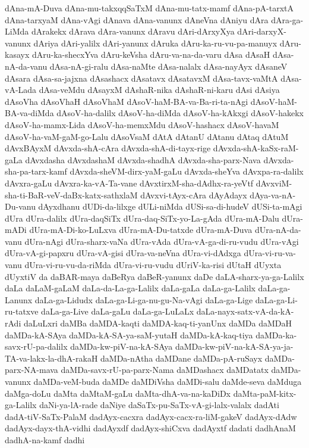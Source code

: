 {dAna-mA-Duva
dAna-mu-takxqqSaTxM
dAna-mu-tatx-mamf
dAna-pA-tarxtA
dAna-tarxyaM
dAna-vAgi
dAnava
dAna-vanunx
dAneVna
dAniyu
dAra
dAra-ga-LiMda
dArakekx
dArava
dAra-vanunx
dAravu
dAri-dArxyXya
dAri-darxyX-vanunx
dAriya
dAri-yalilx
dAri-yanunx
dAruka
dAru-ka-ru-vu-pa-manuyx
dAru-kasayx
dAru-ka-shecxYva
dAru-keVsha
dAru-va-na-da-varu
dAsa
dAsaH
dAsa-nA-da-vanu
dAsa-nA-gi-ralu
dAsa-naMte
dAsa-nalalx
dAsa-nayAyx
dAsaneV
dAsara
dAsa-sa-jajxna
dAsashacx
dAsatavx
dAsatavxM
dAsa-tavx-vaMtA
dAsa-vA-Lada
dAsa-veMdu
dAsayxM
dAshaR-nika
dAshaR-ni-karu
dAsi
dAsiya
dAsoVha
dAsoVhaH
dAsoVhaM
dAsoV-haM-BA-va-Ba-ri-ta-nAgi
dAsoV-haM-BA-va-diMda
dAsoV-ha-dalilx
dAsoV-ha-diMda
dAsoV-ha-kAkxgi
dAsoV-hakekx
dAsoV-ha-mamx-Lida
dAsoV-ha-memxMdu
dAsoV-hashacx
dAsoV-havaM
dAsoV-ha-vaM-gaM-go-Lalu
dAsoVsaM
dAtA
dAtanU
dAtanu
dAtaq
dAtuM
dAvxBAyxM
dAvxda-shA-cAra
dAvxda-shA-di-tayx-rige
dAvxda-shA-kaSx-raM-gaLa
dAvxdasha
dAvxdashaM
dAvxda-shadhA
dAvxda-sha-parx-Nava
dAvxda-sha-pa-tarx-kamf
dAvxda-sheVM-dirx-yaM-gaLu
dAvxda-sheYva
dAvxpa-ra-dalilx
dAvxra-gaLu
dAvxra-ka-vA-Ta-vane
dAvxtirxM-sha-dAdhx-ra-yeVtf
dAvxviM-sha-ti-BaR-veV-daBx-katx-sathxlaM
dAvxvi-tAyx-cAra
dAyAdayx
dAya-va-nA-Du-vanu
dAyxdhanu
dUDi-da-lilxge
dULi-niMda
dUSi-sa-di-hudeV
dUSi-ta-mAgi
dUra
dUra-dalilx
dUra-daqSiTx
dUra-daq-SiTx-yo-La-gAda
dUra-mA-Dalu
dUra-mADi
dUra-mA-Di-ko-LuLxva
dUra-mA-Du-tatxde
dUra-mA-Duva
dUra-nA-da-vanu
dUra-nAgi
dUra-sharx-vaNa
dUra-vAda
dUra-vA-ga-di-ru-vudu
dUra-vAgi
dUra-vA-gi-papxru
dUra-vA-gisi
dUra-va-neVna
dUra-vi-dAdxga
dUra-vi-ru-va-vanu
dUra-vi-ru-vu-da-riMda
dUra-vi-ru-vudu
dUriV-ka-risi
dUtaH
dUyxta
dUyxtiV
da
daBAR-maya
daBeRya
daBeR-yanunx
daDe
daLA-sharx-ya-ga-Lalilx
daLa
daLaM-gaLaM
daLa-da-La-ga-Lalilx
daLa-gaLa
daLa-ga-Lalilx
daLa-ga-Lanunx
daLa-ga-Lidudx
daLa-ga-Li-ga-nu-gu-Na-vAgi
daLa-ga-Lige
daLa-ga-Li-ru-tatxve
daLa-ga-Live
daLa-gaLu
daLa-ga-LuLaLx
daLa-nayx-satx-vA-da-kA-rAdi
daLuLxri
daMBa
daMDA-kaqti
daMDA-kaq-ti-yanUnx
daMDa
daMDaH
daMDa-kA-SAya
daMDa-kA-SA-ya-saM-yutaH
daMDa-kA-kaq-tiya
daMDa-ka-savx-rU-pa-dalilx
daMDa-kw-piV-na-kA-SAya
daMDa-kw-piV-na-kA-SA-ya-ja-TA-va-lakx-la-dhA-rakaH
daMDa-nAtha
daMDane
daMDa-pA-ruSayx
daMDa-parx-NA-mava
daMDa-savx-rU-pa-parx-Nama
daMDashacx
daMDatatx
daMDa-vanunx
daMDa-veM-buda
daMDe
daMDiVsha
daMDi-salu
daMde-seva
daMduga
daMga-doLu
daMta
daMtaM-gaLu
daMta-dhA-va-na-kaDiDx
daMta-paM-kitx-ga-Lalilx
daNi-ya-lA-rade
daNiye
daSaTx-pu-SaTx-vA-gi-lalx-valalx
dadAti
dadA-tiV-SaTx-PalaM
dadAyx-cacxra
dadAyx-cacx-ra-liM-gakeV
dadAyx-dAdw
dadAyx-dayx-thA-vidhi
dadAyxdf
dadAyx-shiCxva
dadAyxtf
dadati
dadhAnaM
dadhA-na-kamf
dadhi
}
